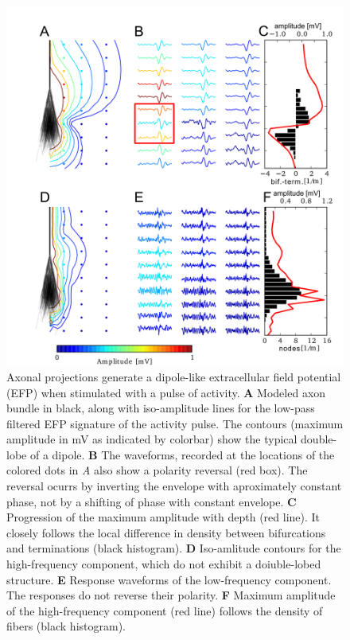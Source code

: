 \documentclass[]{article}
\begin{document}
\begin{figure}[htbp]
\centering
\includegraphics{../figs/fig_2.pdf}
\caption{\label{fig:bigtree}Axonal projections generate a dipole-like
extracellular field potential (EFP) when stimulated with a pulse of
activity. \textbf{A} Modeled axon bundle in black, along with
iso-amplitude lines for the low-pass filtered EFP signature of the
activity pulse. The contours (maximum amplitude in mV as indicated by
colorbar) show the typical double-lobe of a dipole. \textbf{B} The
waveforms, recorded at the locations of the colored dots in \emph{A}
also show a polarity reversal (red box). The reversal ocurrs by
inverting the envelope with aproximately constant phase, not by a
shifting of phase with constant envelope. \textbf{C} Progression of the
maximum amplitude with depth (red line). It closely follows the local
difference in density between bifurcations and terminations (black
histogram). \textbf{D} Iso-amlitude contours for the high-frequency
component, which do not exhibit a doiuble-lobed structure. \textbf{E}
Response waveforms of the low-frequency component. The responses do not
reverse their polarity. \textbf{F} Maximum amplitude of the
high-frequency component (red line) follows the density of fibers (black
histogram).}
\end{figure}
\end{document}
